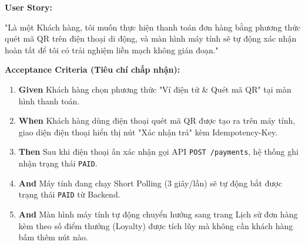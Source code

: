 \hspace{1cm}\textbf{User Story:}

\hspace{1cm}
"Là một Khách hàng, tôi muốn thực hiện thanh toán đơn hàng
bằng phương thức quét mã QR trên điện thoại di động,
và màn hình máy tính sẽ tự động xác nhận hoàn tất 
để tôi có trải nghiệm liền mạch không gián đoạn."

\vspace{15pt}

\textbf{Acceptance Criteria (Tiêu chí chấp nhận):}

\begin{enumerate}

\item \textbf{Given} Khách hàng chọn phương thức "Ví điện tử \& Quét mã QR"
tại màn hình thanh toán.

\item \textbf{When} Khách hàng dùng điện thoại quét mã QR được tạo ra trên máy tính,
giao diện điện thoại hiển thị nút "Xác nhận trả" kèm Idempotency-Key.

\item \textbf{Then} Sau khi điện thoại ấn xác nhận gọi API \texttt{POST /payments},
hệ thống ghi nhận trạng thái \texttt{PAID}.

\item \textbf{And} Máy tính đang chạy Short Polling (3 giây/lần) sẽ tự động
bắt được trạng thái \texttt{PAID} từ Backend.

\item \textbf{And} Màn hình máy tính tự động chuyển hướng sang trang 
Lịch sử đơn hàng kèm theo số điểm thưởng (Loyalty) được tích lũy 
mà không cần khách hàng bấm thêm nút nào.

\end{enumerate}